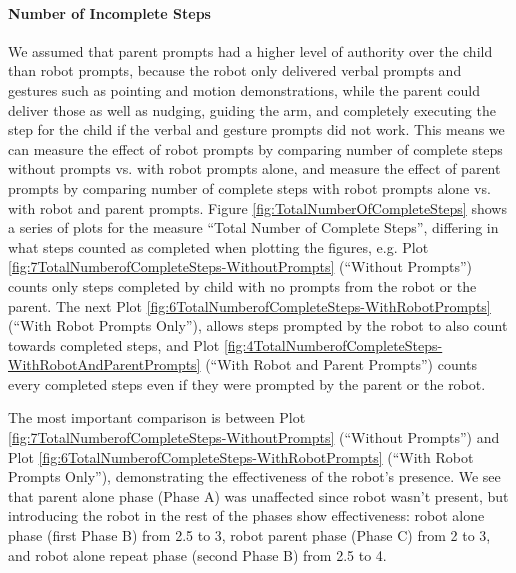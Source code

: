 \documentclass{ut-thesis}
\begin{document}
\paragraph{Number of Incomplete Steps}
We assumed that parent prompts had a higher level of authority over the child than robot prompts, because the robot only delivered verbal prompts and gestures such as pointing and motion demonstrations, while the parent could deliver those as well as nudging, guiding the arm, and completely executing the step for the child if the verbal and gesture prompts did not work.  This means we can measure the effect of robot prompts by comparing number of complete steps without prompts vs. with robot prompts alone, and measure the effect of parent prompts by comparing number of complete steps with robot prompts alone vs. with robot and parent prompts.  Figure \ref{fig:TotalNumberOfCompleteSteps} shows a series of plots for the measure ``Total Number of Complete Steps'', differing in what steps counted as completed when plotting the figures, e.g. Plot \ref{fig:7TotalNumberofCompleteSteps-WithoutPrompts} (``Without Prompts'') counts only steps completed by child with no prompts from the robot or the parent.  The next Plot \ref{fig:6TotalNumberofCompleteSteps-WithRobotPrompts} (``With Robot Prompts Only''), allows steps prompted by the robot to also count towards completed steps, and Plot \ref{fig:4TotalNumberofCompleteSteps-WithRobotAndParentPrompts} (``With Robot and Parent Prompts'') counts every completed steps even if they were prompted by the parent or the robot.

The most important comparison is between Plot \ref{fig:7TotalNumberofCompleteSteps-WithoutPrompts} (``Without Prompts'') and Plot \ref{fig:6TotalNumberofCompleteSteps-WithRobotPrompts} (``With Robot Prompts Only''), demonstrating the effectiveness of the robot's presence.  We see that parent alone phase (Phase A) was unaffected since robot wasn't present, but introducing the robot in the rest of the phases show effectiveness: robot alone phase (first Phase B) from 2.5 to 3, robot parent phase (Phase C) from 2 to 3, and robot alone repeat phase (second Phase B) from 2.5 to 4.
\end{document}

